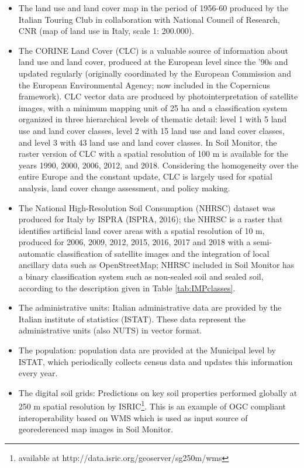\documentclass[APA,LATO1COL,doublespace]{WileyNJD-v2}
\begin{document}
\begin{itemize}
    \item The land use and land cover map in the period of 1956-60 produced by the Italian Touring Club in collaboration with National Council of Research, CNR (map of land use in Italy, scale 1: 200.000).
    \item The CORINE Land Cover (CLC) is a valuable source of information about land use and land cover, produced at the European level since the '90s and updated regularly (originally coordinated by the European Commission and the European Environmental Agency; now included in the Copernicus framework).
    CLC vector data are produced by photointerpretation of satellite images, with a minimum mapping unit of 25 ha and a classification system organized in three hierarchical levels of thematic detail: level 1 with 5 land use and land cover classes, level 2 with 15 land use and land cover classes, and level 3 with 43 land use and land cover classes. 
    In Soil Monitor, the raster version of CLC with a spatial resolution of 100 m is available for the years 1990, 2000, 2006, 2012, and 2018. Considering the homogeneity over the entire Europe and the constant update, CLC is largely used for spatial analysis, land cover change assessment, and policy making.
    \item The National High-Resolution Soil Consumption (NHRSC) dataset was produced for Italy by ISPRA (ISPRA, 2016); the NHRSC is a raster that identifies artificial land cover areas with a spatial resolution of 10 m, produced for 2006, 2009, 2012, 2015, 2016, 2017 and 2018 with a semi-automatic classification of satellite images and the integration of local ancillary data such as OpenStreetMap; NHRSC included in Soil Monitor has a binary classification system such as non-sealed soil and sealed soil, according to the description given in Table \ref{tab:IMPclasses}.
    \item The administrative units: Italian administrative data are provided by the Italian institute of statistics (ISTAT). 
    These data represent the administrative units (also NUTS) in vector format.
    \item The population: population data are provided at the Municipal level by ISTAT, which periodically collects census data and updates this information every year. 
    \item The digital soil grids: Predictions on key soil properties performed globally at 250 m spatial resolution by ISRIC\footnote{available at http://data.isric.org/geoserver/sg250m/wms}. This is an example of OGC compliant interoperability based on WMS which is used as input source of georederenced map images in Soil Monitor.
\end{itemize}
\end{document}
